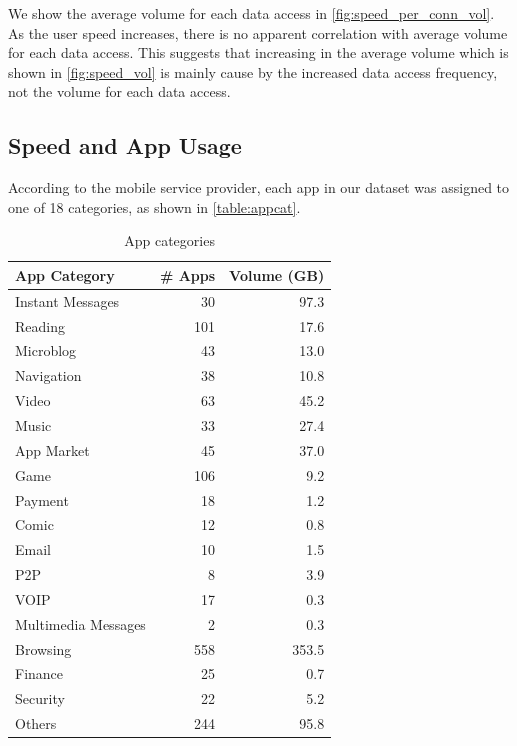 We show the average volume for each data access in \autoref{fig:speed_per_conn_vol}. As the user speed increases, there is no apparent correlation with average volume for each data access. This suggests that increasing in the average volume which is shown in \autoref{fig:speed_vol} is mainly cause by the increased data access frequency, not the volume for each data access.

\subsection{Speed and App Usage}

According to the mobile service provider, each app in our dataset was assigned to one of 18 categories, as shown in \autoref{table:appcat}.
\begin{table}[h]
	\centering
	\begin{tabular}{lrr}\hline
	App Category & \# Apps & Volume (GB) \\
    \hline
	Instant Messages & 30 & 97.3\\
	Reading & 101 & 17.6\\
	Microblog & 43 & 13.0\\
	Navigation  & 38 & 10.8\\
	Video  & 63 & 45.2\\
	Music  & 33 & 27.4\\
	App Market & 45 & 37.0\\
	Game  & 106 & 9.2\\
	Payment & 18 & 1.2\\
	Comic & 12 & 0.8\\
	Email & 10 & 1.5\\
	P2P & 8 & 3.9\\
	VOIP  & 17 & 0.3\\
	Multimedia Messages & 2 & 0.3\\
	Browsing & 558 & 353.5\\
	Finance  & 25 & 0.7\\
	Security  & 22 & 5.2\\
    Others  & 244 & 95.8\\
    \hline
	\end{tabular}
	\caption{App categories}
	\label{table:appcat}
\end{table}

